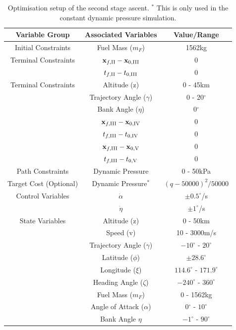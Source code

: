 \begin{table}[ht]
	\centering
	\begin{tabular}{|c|c|c|}
		\hline \textbf{Variable Group}  & \textbf{Associated Variables} & \textbf{Value/Range}\\
		\hline Initial Constraints  & Fuel Mass ($m_F$) & 1562kg\\ 
		Terminal Constraints & $\textbf{x}_{f,\textrm{\rom{2}}} - \textbf{x}_{0,\textrm{\rom{3}}}$ & 0\\ & $t_{f,\textrm{\rom{2}}} - t_{0,\textrm{\rom{3}}}$ & 0\\
		\hline Terminal Constraints & Altitude (z) & 0 - 45km\\ & Trajectory Angle ($\gamma$)& 0 - 20$^\circ$\\  & Bank Angle ($\eta$)& 0$^\circ$\\  & $\textbf{x}_{f,\textrm{\rom{3}}} - \textbf{x}_{0,\textrm{\rom{4}}}$ & 0\\ & $t_{f,\textrm{\rom{3}}} - t_{0,\textrm{\rom{4}}}$ & 0\\
		 & $\textbf{x}_{f,\textrm{\rom{3}}} - \textbf{x}_{0,\textrm{\rom{5}}}$ & 0\\ & $t_{f,\textrm{\rom{3}}} - t_{0,\textrm{\rom{5}}}$ & 0\\
		\hline Path Constraints & Dynamic Pressure& 0 - 50kPa\\ 
		\hline Target Cost (Optional) & Dynamic Pressure$^*$ & $(q-50000)^2/50000$\\ 
		\hline Control Variables & $\dot{\alpha}$ &  $\pm0.5^\circ$/s\\  & $\dot{\eta}$ &  $\pm1^\circ$/s\\ 
		\hline State Variables & Altitude (z) & 0 - 50km\\ & Speed (v)& 10 - 3000m/s\\ & Trajectory Angle ($\gamma$)& $-10^\circ$ - $20^\circ$\\   & Latitude ($\phi$) &$\pm28.6^\circ$ \\  & Longitude ($\xi$)& $114.6^\circ$ - $171.9^\circ$\\   & Heading Angle ($\zeta$)& $-240^\circ$ - $360^\circ$ \\  & Fuel Mass ($m_F$)& 0 - 1562kg \\  & Angle of Attack ($\alpha$)&  0$^\circ$ - $10^\circ$ \\  & Bank Angle $\eta$& $-1^\circ$ - $90^\circ$ \\  
		\hline 
	\end{tabular} 
	\caption{Optimisation setup of the second stage ascent. $^*$ This is only used in the constant dynamic pressure simulation.}
	\label{tab:SPARTANascentsetup}
\end{table}

